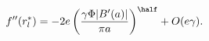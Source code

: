 \begin{equation}
\label{Eq_A20}
f''(r^{*}_l)
  = -2 e \left(\frac{\gamma\Phi|B'(a)|}{\pi a}\right)^{\half}
    +O(e\gamma).
\end{equation}

